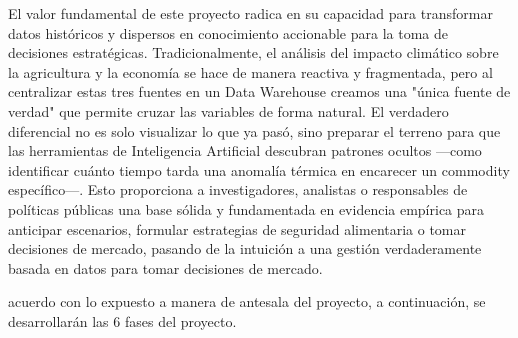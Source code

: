 \documentclass[12pt,letterpaper]{article}
\begin{document}
\noindent El valor fundamental de este proyecto radica en su capacidad para transformar datos históricos y dispersos en conocimiento accionable para la toma de decisiones estratégicas. Tradicionalmente, el análisis del impacto climático sobre la agricultura y la economía se hace de manera reactiva y fragmentada, pero al centralizar estas tres fuentes en un Data Warehouse creamos una "única fuente de verdad" que permite cruzar las variables de forma natural. El verdadero diferencial no es solo visualizar lo que ya pasó, sino preparar el terreno para que las herramientas de Inteligencia Artificial descubran patrones ocultos —como identificar cuánto tiempo tarda una anomalía térmica en encarecer un commodity específico—. Esto proporciona a investigadores, analistas o responsables de políticas públicas una base sólida y fundamentada en evidencia empírica para anticipar escenarios, formular estrategias de seguridad alimentaria o tomar decisiones de mercado, pasando de la intuición a una gestión verdaderamente basada en datos para tomar decisiones de mercado.

\noindent acuerdo con lo expuesto a manera de antesala del proyecto, a continuación, se desarrollarán las 6 fases del proyecto.
\newpage


\newpage
%

\newpage
%

\newpage
%

\newpage
%

\newpage
%

\newpage
%

\newpage
%

\newpage
%

\newpage
%

\newpage
%

\newpage
%
\end{document}
